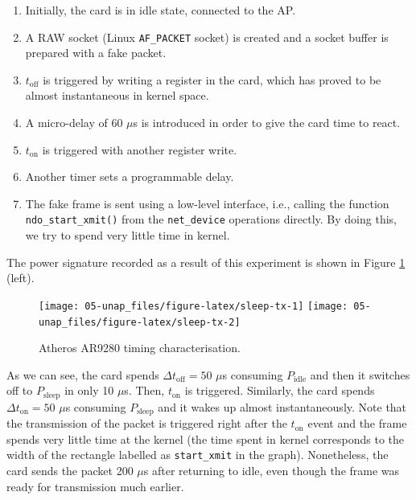 \documentclass[twoside,nohyper]{tufte-book}
\providecommand{\tightlist}{%
  \setlength{\itemsep}{0pt}\setlength{\parskip}{0pt}}
\begin{document}
\begin{enumerate}
\def\labelenumi{\arabic{enumi}.}
\setcounter{enumi}{-1}
\tightlist
\item
  Initially, the card is in idle state, connected to the AP.
\item
  A RAW socket (Linux \texttt{AF\_PACKET} socket) is created and a socket buffer is prepared with a fake packet.
\item
  \(t_\mathrm{off}\) is triggered by writing a register in the card, which has proved to be almost instantaneous in kernel space.
\item
  A micro-delay of 60 \(\mu\)s is introduced in order to give the card time to react.
\item
  \(t_\mathrm{on}\) is triggered with another register write.
\item
  Another timer sets a programmable delay.
\item
  The fake frame is sent using a low-level interface, i.e., calling the function \texttt{ndo\_start\_xmit()} from the \texttt{net\_device} operations directly. By doing this, we try to spend very little time in kernel.
\end{enumerate}

The power signature recorded as a result of this experiment is shown in Figure \ref{fig:sleep-tx} (left).



\begin{figure}

{\centering \texttt{[image: 05-unap\_files/figure-latex/sleep-tx-1]} \texttt{[image: 05-unap\_files/figure-latex/sleep-tx-2]} 

}

\caption[Atheros AR9280 timing characterisation.]{Atheros AR9280 timing characterisation.}\label{fig:sleep-tx}
\end{figure}

As we can see, the card spends \(\Delta t_\mathrm{off} = 50\) \(\mu\)s consuming \(P_\mathrm{idle}\) and then it switches off to \(P_\mathrm{sleep}\) in only 10 \(\mu\)s. Then, \(t_\mathrm{on}\) is triggered. Similarly, the card spends \(\Delta t_\mathrm{on} = 50\) \(\mu\)s consuming \(P_\mathrm{sleep}\) and it wakes up almost instantaneously. Note that the transmission of the packet is triggered right after the \(t_\mathrm{on}\) event and the frame spends very little time at the kernel (the time spent in kernel corresponds to the width of the rectangle labelled as \texttt{start\_xmit} in the graph). Nonetheless, the card sends the packet 200 \(\mu\)s after returning to idle, even though the frame was ready for transmission much earlier.
\end{document}
